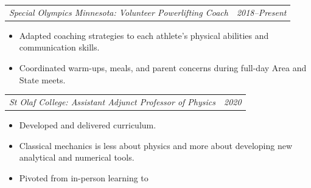 \documentclass[12pt,letterpaper]{article}
\makeatletter
\newcommand{\headerpair}[2]{
    \begin{tabular*}{\linewidth}{l@{ \extracolsep{\fill} }r} {\large\emph{#1}} & {\large\emph{#2}}
    \end{tabular*}
}
\newcommand{\headerrow}[3]{\headerpair{#2: #1}{#3}}
\makeatother
\begin{document}
\begin{itemize}

\end{itemize}


\headerrow
    {Volunteer Powerlifting Coach}
    {Special Olympics Minnesota}
    {2018--Present}
\begin{itemize}
    \item Adapted coaching strategies to each athlete's physical abilities and communication skills.
    \item Coordinated warm-ups, meals, and parent concerns during full-day Area and State meets.
\end{itemize}


\headerrow
    {Assistant Adjunct Professor of Physics}
    {St Olaf College}
    {2020}
\begin{itemize}
    \item Developed and delivered curriculum.
    \item Classical mechanics is less about physics and more about developing new analytical and numerical tools.
    \item Pivoted from in-person learning to
\end{itemize}
\end{document}
